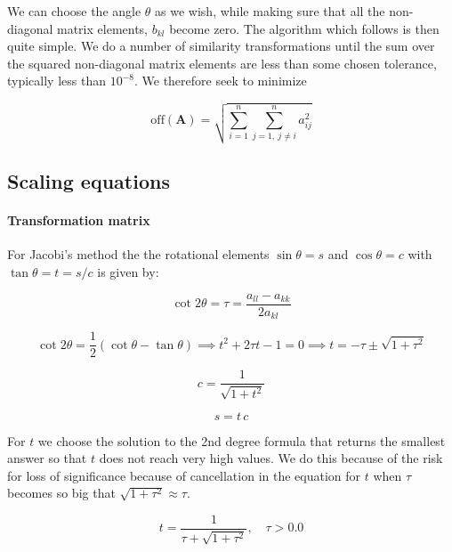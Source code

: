 \documentclass[a4paper, fontsize=11pt]{article}
\begin{document}
We can choose the angle $\theta$ as we wish, while making sure that all the non-diagonal matrix elements, $b_{kl}$ become zero. The algorithm which follows is then quite simple. We do a number of similarity transformations until the sum over the squared non-diagonal matrix elements are less than some chosen tolerance, typically less than $10^{-8}$. We therefore seek to minimize

\begin{equation}
\text{off}(\textbf{A}) = \sqrt{\sum^{n}_{i=1} \sum^{n}_{j=1, \: j \neq i} a_{ij}^{2}}
\end{equation}



\subsection{Scaling equations}
\paragraph{Transformation matrix}

For Jacobi's method the the rotational elements $\sin \theta = s$ and $\cos \theta = c$ with $\tan \theta = t = s / c$ is given by:

\begin{equation}
\cot 2\theta = \tau = \frac{a_{ll} - a_{kk}}{2 a_{kl}}
\end{equation}

\begin{equation}
\cot 2\theta = \frac{1}{2}\left(\cot \theta - \tan \theta \right) \implies t^2 + 2 \tau t - 1 = 0 \implies t = -\tau \pm \sqrt{1 + \tau^2} 
\end{equation}

\begin{equation}
c = \frac{1}{\sqrt{1+ t^2}}
\end{equation}

\begin{equation}
s = t\,c
\end{equation}

For $t$ we choose the solution to the 2nd degree formula that returns the smallest answer so that $t$ does not reach very high values. We do this because of the risk for loss of significance because of cancellation in the equation for $t$ when $\tau$ becomes so big that $\sqrt{1 + \tau^2} \approx \tau $.

\begin{equation}
t = \frac{1}{\tau + \sqrt{1 + \tau^2}}, \quad \tau > 0.0
\end{equation}
\end{document}
